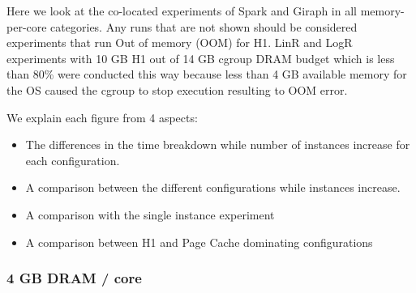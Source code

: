Here we look at the co-located experiments of Spark and Giraph in all memory-per-core categories.
Any runs that are not shown should be considered experiments that run Out of memory (OOM) for H1.
LinR and LogR experiments with 10 GB H1 out of 14 GB cgroup DRAM budget which is less than 80\% were conducted this way
because less than 4 GB available memory for the OS caused the cgroup to stop execution resulting to OOM error.

We explain each figure from 4 aspects:
\begin{itemize}
\item{The differences in the time breakdown while number of instances increase for each configuration.}
\item{A comparison between the different configurations while instances increase.}
\item{A comparison with the single instance experiment}
\item{A comparison between H1 and Page Cache dominating configurations}
\end{itemize}

\subsubsection{4 GB DRAM / core}

